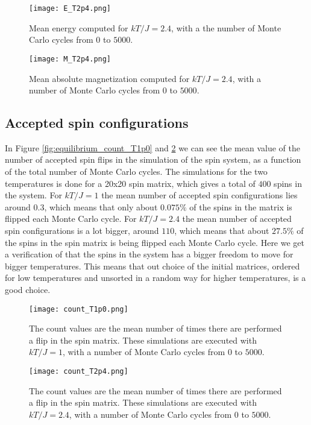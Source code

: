 \documentclass[12pt]{article}
\begin{document}
\begin{flushleft}
\begin{figure}[!h]
\centering
\begin{minipage}[b]{0.45\linewidth}
    \texttt{[image: E\_T2p4.png]}
  \caption{Mean energy computed for $kT/J = 2.4$, with a the number of Monte Carlo cycles from $0$ to $5000$.}
  \label{fig:equilibrium_E_T2p4}
\end{minipage}
\quad
\begin{minipage}[b]{0.45\linewidth}
    \texttt{[image: M\_T2p4.png]}
  \caption{Mean absolute magnetization computed for $kT/J = 2.4$, with a number of Monte Carlo cycles from $0$ to $5000$.}
  \label{fig:equilibrium_M_T2p4}
\end{minipage}
\end{figure}
\newpage
\subsection{Accepted spin configurations}
In Figure \ref{fig:equilibrium_count_T1p0} and \ref{fig:equilibrium_count_T2p4} we can see the mean value of the number of accepted spin flips in the simulation of the spin system, as a function of the total number of Monte Carlo cycles. The simulations for the two temperatures is done for a 20x20 spin matrix, which gives a total of $400$ spins in the system. For $kT/J=1$ the mean number of accepted spin configurations lies around $0.3$, which means that only about $0.075\%$ of the spins in the matrix is flipped each Monte Carlo cycle. For $kT/J = 2.4$ the mean number of accepted spin configurations is a lot bigger, around $110$, which means that about $27.5\%$ of the spins in the spin matrix is being flipped each Monte Carlo cycle. Here we get a verification of that the spins in the system has a bigger freedom to move for bigger temperatures. This means that out choice of the initial matrices, ordered for low temperatures and unsorted in a random way for higher temperatures, is a good choice.

\begin{figure}[!h]
\centering
\begin{minipage}[b]{0.45\linewidth}
    \texttt{[image: count\_T1p0.png]}
  \caption{The count values are the mean number of times there are performed a flip in the spin matrix. These simulations are executed with $kT/J = 1$, with a number of Monte Carlo cycles from $0$ to $5000$.}
  \label{fig:equilibrium_count_T1p0}
\end{minipage}
\quad
\begin{minipage}[b]{0.45\linewidth}
    \texttt{[image: count\_T2p4.png]}
    \caption{The count values are the mean number of times there are performed a flip in the spin matrix. These simulations are executed with $kT/J = 2.4$, with a number of Monte Carlo cycles from $0$ to $5000$.}
  \label{fig:equilibrium_count_T2p4}
\end{minipage}
\end{figure}



\end{flushleft}
\end{document}

